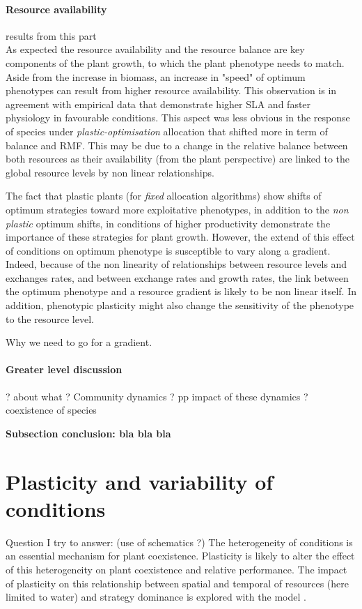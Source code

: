 \paragraph{Resource availability}

results from this part\\
As expected the resource availability and the resource balance are key components of the plant growth, to which the plant phenotype needs to match. Aside from the increase in biomass, an increase in "speed" of optimum phenotypes can result from higher resource availability. This observation is in agreement with empirical data that demonstrate higher SLA and faster physiology in favourable conditions. This aspect was less obvious in the response of species under \textit{plastic-optimisation} allocation that shifted more in term of balance and RMF. This may be due to a change in the relative balance between both resources as their availability (from the plant perspective) are linked to the global resource levels by non linear relationships.

The fact that plastic plants (for \textit{fixed} allocation algorithms) show shifts of optimum strategies toward more exploitative phenotypes, in addition to the \textit{non plastic} optimum shifts, in conditions of higher productivity demonstrate the importance of these strategies for plant growth. However, the extend of this effect of conditions on optimum phenotype is susceptible to vary along a gradient. Indeed, because of the non linearity of relationships between resource levels and exchanges rates, and between exchange rates and growth rates, the link between the optimum phenotype and a resource gradient is likely to be non linear itself. In addition, phenotypic plasticity might also change the sensitivity of the phenotype to the resource level.

Why we need to go for a gradient.

\paragraph{Greater level discussion}
? about what ? Community dynamics ? pp impact of these dynamics ? coexistence of species


\textbf{Subsection conclusion: bla bla bla}


\section{Plasticity and variability of conditions}
Question I try to answer: (use of schematics ?)
The heterogeneity of conditions is an essential mechanism for plant coexistence. Plasticity is likely to alter the effect of this heterogeneity on plant coexistence and relative performance. The impact of plasticity on this relationship between spatial and temporal  of resources (here limited to water) and strategy dominance is explored with the model \model.\\

